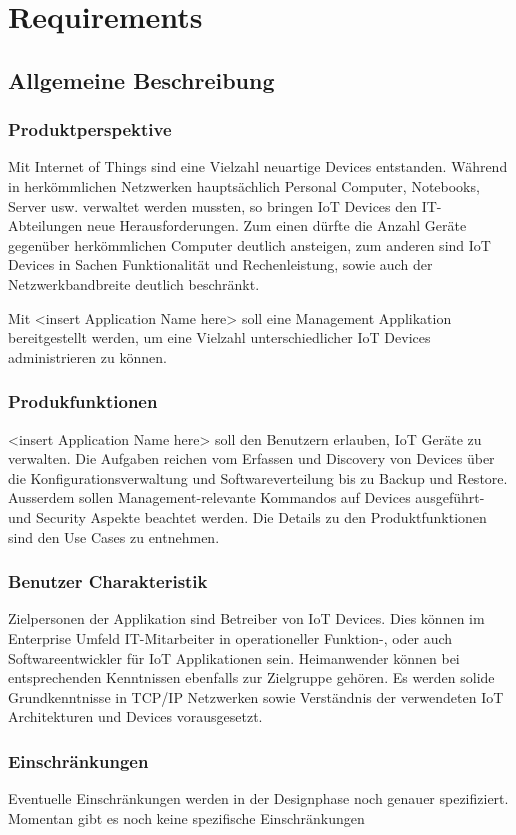 \chapter{Requirements}
\section{Allgemeine Beschreibung}
\subsection{Produktperspektive}
Mit Internet of Things sind eine Vielzahl neuartige Devices entstanden. Während in herkömmlichen Netzwerken hauptsächlich Personal Computer, Notebooks, Server usw. verwaltet werden mussten, so bringen IoT Devices den IT-Abteilungen neue Herausforderungen. Zum einen dürfte die Anzahl Geräte gegenüber herkömmlichen Computer deutlich ansteigen, zum anderen sind IoT Devices in Sachen Funktionalität und Rechenleistung, sowie auch der Netzwerkbandbreite deutlich beschränkt. 

Mit <insert Application Name here> soll eine Management Applikation bereitgestellt werden, um eine Vielzahl unterschiedlicher IoT Devices administrieren zu können. 
\subsection{Produkfunktionen}
<insert Application Name here> soll den Benutzern erlauben, IoT Geräte zu verwalten. Die Aufgaben reichen vom Erfassen und Discovery von Devices über die Konfigurationsverwaltung und Softwareverteilung bis zu Backup und Restore. Ausserdem sollen Management-relevante Kommandos auf Devices ausgeführt- und Security Aspekte beachtet werden. Die Details zu den Produktfunktionen sind den Use Cases zu entnehmen.

\subsection{Benutzer Charakteristik}
Zielpersonen der Applikation sind Betreiber von IoT Devices. Dies können im Enterprise Umfeld IT-Mitarbeiter in operationeller Funktion-, oder auch Softwareentwickler für IoT Applikationen sein. Heimanwender können bei entsprechenden Kenntnissen ebenfalls zur Zielgruppe gehören. Es werden solide Grundkenntnisse in TCP/IP Netzwerken sowie Verständnis der verwendeten IoT Architekturen und Devices vorausgesetzt. 
\subsection{Einschränkungen}
Eventuelle Einschränkungen werden in der Designphase noch genauer spezifiziert. Momentan gibt es noch keine spezifische Einschränkungen
